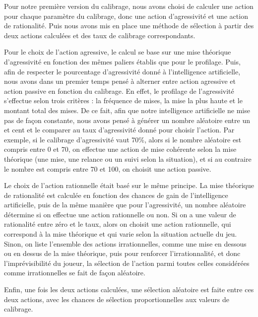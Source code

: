 \documentclass{report}
\begin{document}
Pour notre première version du calibrage, nous avons choisi de calculer une action pour chaque paramètre du calibrage, donc une action d'agressivité et une action de rationalité. Puis nous avons mis en place une méthode de sélection à partir des deux actions calculées et des taux de calibrage correspondants.\par
Pour le choix de l'action agressive, le calcul se base sur une mise théorique d'agressivité en fonction des mêmes paliers établis que pour le profilage. Puis, afin de respecter le pourcentage d'agressivité donné à l'intelligence artificielle, nous avons dans un premier temps pensé à alterner entre action agressive et action passive en fonction du calibrage. En effet, le profilage de l'agressivité s'effectue selon trois critères : la fréquence de mises, la mise la plus haute et le montant total des mises. De ce fait, afin que notre intelligence artificielle ne mise pas de façon constante, nous avons pensé à générer un nombre aléatoire entre un et cent et le comparer au taux d'agressivité donné pour choisir l'action. Par exemple, si le calibrage d'agressivité vaut 70\%, alors si le nombre aléatoire est compris entre 0 et 70, on effectue une action de mise cohérente selon la mise théorique (une mise, une relance ou un suivi selon la situation), et si au contraire le nombre est compris entre 70 et 100, on choisit une action passive.\par


Le choix de l'action rationnelle était basé sur le même principe. La mise théorique de rationalité est calculée en fonction des chances de gain de l'intelligence artificielle, puis de la même manière que pour l'agressivité, un nombre aléatoire détermine si on effectue une action rationnelle ou non. Si on a une valeur de rationalité entre zéro et le taux, alors on choisit une action rationnelle, qui correspond à la mise théorique et qui varie selon la situation actuelle du jeu. Sinon, on liste l'ensemble des actions irrationnelles, comme une mise en dessous ou en dessus de la mise théorique, puis pour renforcer l'irrationnalité, et donc l'imprévisibilité du joueur, la sélection de l'action parmi toutes celles considérées comme irrationnelles se fait de façon aléatoire.\par
Enfin, une fois les deux actions calculées, une sélection aléatoire est faite entre ces deux actions, avec les chances de sélection proportionnelles aux valeurs de calibrage.\\
\end{document}

